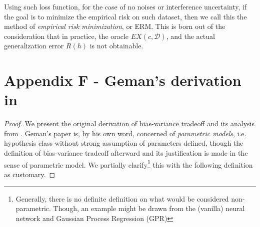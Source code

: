 \documentclass[10pt]{article} %
\begin{document}
Using such loss function, for the case of no noises or interference uncertainty, if the goal is to minimize the empirical risk on such dataset, then we call this the method of \textit{empirical risk minimization}, or ERM. This is born out of the consideration that in practice, the oracle $EX(c,\mathcal{D})$, and the actual generalization error $R(h)$ is not obtainable. 
\section*{Appendix F - Geman's derivation in \cite{6797087}}

\begin{proof}
    We present the original derivation of bias-variance tradeoff and its analysis from \cite{6797087}. Geman's paper is, by his own word, concerned of \textit{parametric models}, i.e. hypothesis class without strong assumption of parameters defined, though the definition of bias-variance tradeoff afterward and its justification is made in the sense of parametric model. We partially clarify\footnote{Generally, there is no definite definition on what would be considered non-parametric. Though, an example might be drawn from the (vanilla) neural network and Gaussian Process Regression (GPR)} this with the following definition as customary. 


\end{proof}
\end{document}
